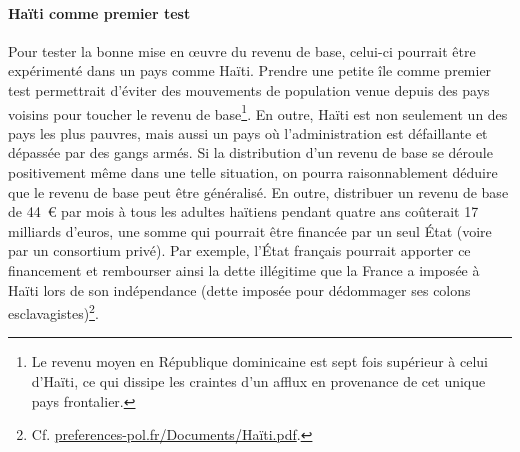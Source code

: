 \documentclass[a5paper,french,openany]{memoir}
\begin{document}
\paragraph{Haïti comme premier test}
Pour tester la bonne mise en œuvre du revenu de base, celui-ci pourrait être expérimenté dans un pays comme Haïti. Prendre une petite île comme premier test permettrait d'éviter des mouvements de population venue depuis des pays voisins pour toucher le revenu de base\footnote{Le revenu moyen en République dominicaine est sept fois supérieur à celui d'Haïti, ce qui dissipe les craintes d'un afflux en provenance de cet unique pays frontalier.}. En outre, Haïti est non seulement un des pays les plus pauvres, mais aussi un pays où l'administration est défaillante et dépassée par des gangs armés. Si la distribution d'un revenu de base se déroule positivement même dans une telle situation, on pourra raisonnablement déduire que le revenu de base peut être généralisé. En outre, distribuer un revenu de base de 44~\euro{} par mois à tous les adultes haïtiens pendant quatre ans coûterait 17 milliards d'euros, une somme qui pourrait être financée par un seul État (voire par un consortium privé). %
Par exemple, l'État français pourrait apporter ce financement et rembourser ainsi la dette illégitime que la France a imposée à Haïti lors de son indépendance (dette imposée pour dédommager ses colons esclavagistes)\footnote{Cf. \href{http://preferences-pol.fr/Documents/Haïti.pdf}{preferences-pol.fr/Documents/Haïti.pdf}.}.%


\end{document}
